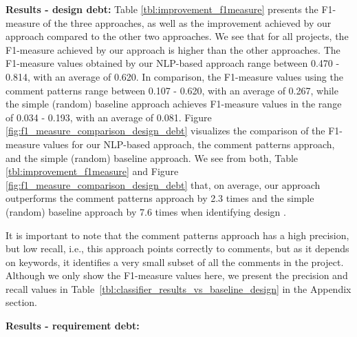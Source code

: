 \vspace{1mm}

\noindent \textbf{Results - design debt:} Table \ref{tbl:improvement_f1measure} presents the F1-measure of the three approaches, as well as the improvement achieved by our approach compared to the other two approaches. We see that for all projects, the F1-measure achieved by our approach is higher than the other approaches. The F1-measure values obtained by our NLP-based approach range between 0.470 - 0.814, with an average of 0.620. In comparison, the F1-measure values using the comment patterns range between 0.107 - 0.620, with an average of 0.267, while the simple (random) baseline approach achieves F1-measure values in the range of 0.034 - 0.193, with an average of 0.081. Figure \ref{fig:f1_measure_comparison_design_debt} visualizes the comparison of the F1-measure values for our NLP-based approach, the comment patterns approach, and the simple (random) baseline approach. We see from both, Table \ref{tbl:improvement_f1measure} and Figure \ref{fig:f1_measure_comparison_design_debt} that, on average, our approach outperforms the comment patterns approach by 2.3 times and the simple (random) baseline approach by 7.6 times when identifying design \SATD.

It is important to note that the comment patterns approach has a high precision, but low recall, i.e., this approach points correctly to \SATD comments, but as it depends on keywords, it identifies a very small subset of all the \SATD comments in the project. Although we only show the F1-measure values here, we present the precision and recall values in Table~\ref{tbl:classifier_results_vs_baseline_design} in the Appendix section.  

\noindent \textbf{Results - requirement debt:}  
 
